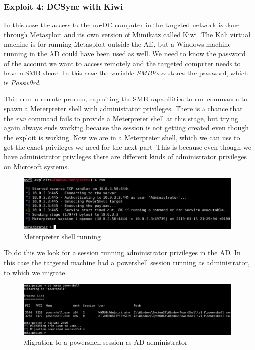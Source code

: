 \subsubsection{Exploit 4: DCSync with Kiwi}
In this case the access to the no-DC computer in the targeted network is done through Metasploit and its own version of Mimikatz called Kiwi\cite{pentestlab}. The Kali virtual machine is for running Metasploit outside the AD, but a Windows machine running in the AD could have been used as well.
\linej
We need to know the password of the account we want to access remotely and the targeted computer needs to have a SMB share.
In this case the variable \textit{SMBPass} stores the password, which is \textit{Passw0rd}.
\linej

\linej
This runs a remote process, exploiting the SMB capabilities to run commands to spawn a Meterpreter shell\cite{meterpreter} with administrator privileges. There is a chance that the \textit{run} command fails to provide a Meterpreter shell at this stage, but trying again always ends working because the session is not getting created even though the exploit is working.
\linej
\linej
Now we are in a Meterpreter shell, which we can use to get the exact privileges we need for the next part. This is because even though we have administrator privileges there are different kinds of administrator privileges on Microsoft systems.
\begin{figure}[H]
	\centering
	\includegraphics[width=\textwidth]{figuras/meterpreter.png}
	\caption{Meterpreter shell running}
\end{figure}

To do this we look for a session running administrator privileges in the AD. In this case the targeted machine had a powershell session running as administrator, to which we migrate.
\linej
\begin{figure}[H]
	\centering
	\includegraphics[width=\textwidth]{figuras/migrate.png}
	\caption{Migration to a powershell session as AD administrator}
\end{figure}

